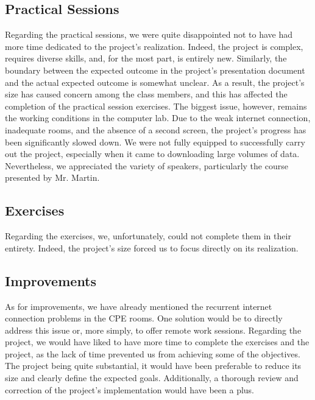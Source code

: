 \documentclass{article}
\begin{document}
    \subsection{Practical Sessions}\label{subsec:sessions}
    Regarding the practical sessions, we were quite disappointed not to have had more time dedicated to the project's realization.
    Indeed, the project is complex, requires diverse skills, and, for the most part, is entirely new.
    Similarly, the boundary between the expected outcome in the project's presentation document and the actual expected outcome is somewhat unclear.
    As a result, the project's size has caused concern among the class members, and this has affected the completion of the practical session exercises.
    The biggest issue, however, remains the working conditions in the computer lab.
    Due to the weak internet connection, inadequate rooms, and the absence of a second screen, the project's progress has been significantly slowed down.
    We were not fully equipped to successfully carry out the project, especially when it came to downloading large volumes of data.
    Nevertheless, we appreciated the variety of speakers, particularly the course presented by Mr. Martin.

    \subsection{Exercises}\label{subsec:exercises}
    Regarding the exercises, we, unfortunately, could not complete them in their entirety.
    Indeed, the project's size forced us to focus directly on its realization.

    \subsection{Improvements}\label{subsec:improvements}
    As for improvements, we have already mentioned the recurrent internet connection problems in the CPE rooms.
    One solution would be to directly address this issue or, more simply, to offer remote work sessions.
    Regarding the project, we would have liked to have more time to complete the exercises and the project, as the lack of time prevented us from achieving some of the objectives.
    The project being quite substantial, it would have been preferable to reduce its size and clearly define the expected goals.
    Additionally, a thorough review and correction of the project's implementation would have been a plus.

    \newpage
\end{document}
